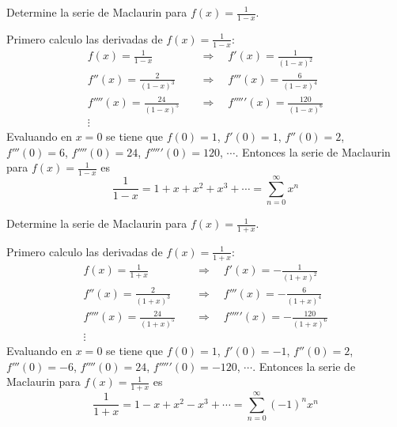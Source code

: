 \documentclass{article}
\begin{document}
\begin{example}{6}
    Determine la serie de Maclaurin para $f(x) = \frac{1}{1-x}$.
\end{example}
Primero calculo las derivadas de $f(x) = \frac{1}{1-x}$:
\begin{align*}
    f(x) = \frac{1}{1-x} \quad &\Rightarrow \quad f'(x) = \frac{1}{(1-x)^2} \\
    f''(x) = \frac{2}{(1-x)^3} \quad &\Rightarrow \quad f'''(x) = \frac{6}{(1-x)^4} \\
    f''''(x) = \frac{24}{(1-x)^5} \quad &\Rightarrow \quad f'''''(x) = \frac{120}{(1-x)^6} \\
    \vdots
\end{align*}
Evaluando en $x=0$ se tiene que $f(0) = 1$, $f'(0) = 1$, $f''(0) = 2$, $f'''(0) = 6$, $f''''(0) = 24$, $f'''''(0) = 120$, $\cdots$. Entonces la serie de Maclaurin para $f(x) = \frac{1}{1-x}$ es
\begin{equation*}
    \frac{1}{1-x} = 1 + x + x^2 + x^3 + \cdots = \sum_{n=0}^{\infty} x^n
\end{equation*}

\newpage
\begin{example}{7}
    Determine la serie de Maclaurin para $f(x) = \frac{1}{1+x}$.
\end{example}
Primero calculo las derivadas de $f(x) = \frac{1}{1+x}$:
\begin{align*}
    f(x) = \frac{1}{1+x} \quad &\Rightarrow \quad f'(x) = -\frac{1}{(1+x)^2} \\
    f''(x) = \frac{2}{(1+x)^3} \quad &\Rightarrow \quad f'''(x) = -\frac{6}{(1+x)^4} \\
    f''''(x) = \frac{24}{(1+x)^5} \quad &\Rightarrow \quad f'''''(x) = -\frac{120}{(1+x)^6} \\
    \vdots
\end{align*}
Evaluando en $x=0$ se tiene que $f(0) = 1$, $f'(0) = -1$, $f''(0) = 2$, $f'''(0) = -6$, $f''''(0) = 24$, $f'''''(0) = -120$, $\cdots$. Entonces la serie de Maclaurin para $f(x) = \frac{1}{1+x}$ es
\begin{equation*}
    \frac{1}{1+x} = 1 - x + x^2 - x^3 + \cdots = \sum_{n=0}^{\infty} (-1)^n x^n
\end{equation*}
\end{document}
